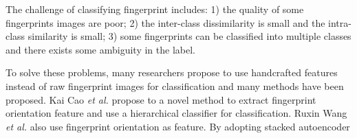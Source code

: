 
The challenge of classifying fingerprint includes: 
%
1) the quality of some fingerprints images are poor; 
%
2) the inter-class dissimilarity is small and the intra-class similarity is small; 
%
3) some fingerprints can be classified into multiple classes and there exists some ambiguity in the label.

To solve these problems, many researchers propose to use handcrafted features instead of raw fingerprint images for classification and many methods have been proposed. 
%
Kai Cao \textit{et al.}\cite{cao2013fingerprint} propose to a novel method to extract fingerprint orientation feature and use a hierarchical classifier for classification.
%
Ruxin Wang \textit{et al.} \cite{wang2014fingerprint} also use fingerprint orientation as feature. By adopting stacked autoencoder